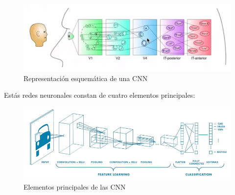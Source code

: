 \documentclass[a4paper]{article}
\begin{document}
\begin{figure}[ht]
    \centering
    \includegraphics[scale=0.5]{images/cnn-1.png}
    \caption{Representación esquemática de una CNN}
    \label{fig:my_label}
\end{figure}

Estás redes neuronales constan de cuatro elementos principales:

\begin{figure}[ht]
    \centering
    \includegraphics[scale=0.35]{images/cnn-2.png}
    \caption{Elementos principales de las CNN}
    \label{fig:my_label}
\end{figure}
\end{document}
